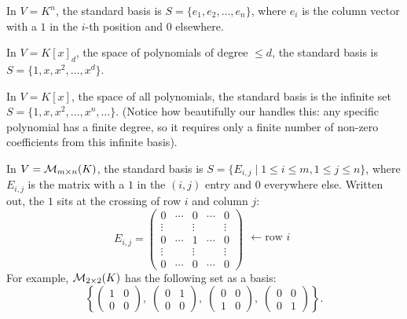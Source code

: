 \begin{example}
In $V = K^n$, the standard basis is $S = \{e_1, e_2, \dots, e_n\}$, where $e_i$ is the column vector with a $1$ in the $i$-th position and $0$ elsewhere.
\end{example}

\begin{example}
In $V = K[x]_d$, the space of polynomials of degree $\le d$, the standard basis is $S = \{1, x, x^2, \dots, x^d\}$. 
\end{example}

\begin{example}
In $V = K[x]$, the space of all polynomials, the standard basis is the infinite set $S = \{1, x, x^2, \dots, x^n, \dots\}$. (Notice how beautifully our  handles this: any specific polynomial has a finite degree, so it requires only a finite number of non-zero coefficients from this infinite basis).
\end{example}

\begin{example}[Matrices]
\label{ex:basis_matrices}
In $V = \mathcal{M}_{m \times n}(K)$, the standard basis is $S = \{E_{i,j} \mid 1 \le i \le m, 1 \le j \le n\}$, where $E_{i,j}$ is the matrix with a $1$ in the $(i,j)$ entry and $0$ everywhere else. Written out, the $1$ sits at the crossing of row $i$ and column $j$:
\[
E_{i,j} =
\begin{pmatrix}
0 & \cdots & 0 & \cdots & 0 \\
\vdots & & \vdots & & \vdots \\
0 & \cdots & 1 & \cdots & 0 \\
\vdots & & \vdots & & \vdots \\
0 & \cdots & 0 & \cdots & 0
\end{pmatrix}
\begin{matrix}
\\ \\ \leftarrow \text{row } i \\ \\ \\
\end{matrix}
\]
For example, $\mathcal{M}_{2 \times 2}(K)$ has the following set as a basis:
\[
\left\{
\begin{pmatrix} 1 & 0 \\ 0 & 0 \end{pmatrix}, \;
\begin{pmatrix} 0 & 1 \\ 0 & 0 \end{pmatrix}, \;
\begin{pmatrix} 0 & 0 \\ 1 & 0 \end{pmatrix}, \;
\begin{pmatrix} 0 & 0 \\ 0 & 1 \end{pmatrix}
\right\}.
\]
\end{example}

